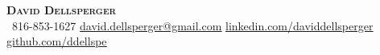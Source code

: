 \begin{center}
    \textbf{\Huge \scshape David Dellsperger} \\ \vspace{1pt}
     \ \small 816-853-1627 \quad
    \href{mailto:david.dellsperger@gmail.com}{ \underline{david.dellsperger@gmail.com}} \quad
    \href{https://www.linkedin.com/in/daviddellsperger/}{ \underline{linkedin.com/daviddellsperger}} \quad
    \href{https://github.com/ddellspe}{ \underline{github.com/ddellspe}}
\end{center}